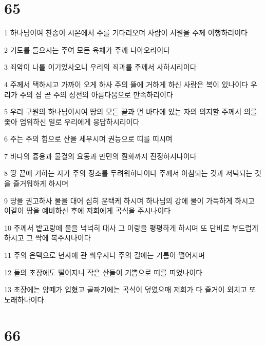 \chapter{65}

\par 1 하나님이여 찬송이 시온에서 주를 기다리오며 사람이 서원을 주께 이행하리이다
\par 2 기도를 들으시는 주여 모든 육체가 주께 나아오리이다
\par 3 죄악이 나를 이기었사오니 우리의 죄과를 주께서 사하시리이다
\par 4 주께서 택하시고 가까이 오게 하사 주의 뜰에 거하게 하신 사람은 복이 있나이다 우리가 주의 집 곧 주의 성전의 아름다움으로 만족하리이다
\par 5 우리 구원의 하나님이시여 땅의 모든 끝과 먼 바다에 있는 자의 의지할 주께서 의를 좇아 엄위하신 일로 우리에게 응답하시리이다
\par 6 주는 주의 힘으로 산을 세우시며 권능으로 띠를 띠시며
\par 7 바다의 흉용과 물결의 요동과 만민의 훤화까지 진정하시나이다
\par 8 땅 끝에 거하는 자가 주의 징조를 두려워하나이다 주께서 아침되는 것과 저녁되는 것을 즐거워하게 하시며
\par 9 땅을 권고하사 물을 대어 심히 윤택케 하시며 하나님의 강에 물이 가득하게 하시고 이같이 땅을 예비하신 후에 저희에게 곡식을 주시나이다
\par 10 주께서 밭고랑에 물을 넉넉히 대사 그 이랑을 평평하게 하시며 또 단비로 부드럽게 하시고 그 싹에 복주시나이다
\par 11 주의 은택으로 년사에 관 씌우시니 주의 길에는 기름이 떨어지며
\par 12 들의 초장에도 떨어지니 작은 산들이 기쁨으로 띠를 띠었나이다
\par 13 초장에는 양떼가 입혔고 골짜기에는 곡식이 덮였으매 저희가 다 즐거이 외치고 또 노래하나이다

\chapter{66}

